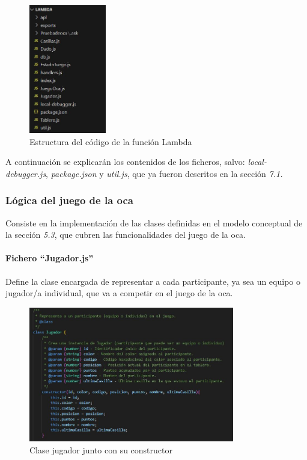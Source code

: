 \begin{figure}[H]
	\centering
	\includegraphics[width=0.3\textwidth]{imgs/estructura-codigo.jpg}
	\caption{Estructura del código de la función Lambda}
	\label{fig:estructura-codigo}
\end{figure}

A continuación se explicarán los contenidos de los ficheros, salvo: \textit{local-debugger.js}, \textit{package.json} y \textit{util.js}, que ya fueron descritos en la sección \textit{7.1.}

\subsubsection{Lógica del juego de la oca}

Consiste en la implementación de las clases definidas en el modelo conceptual de la sección \textit{5.3}, que cubren las funcionalidades del juego de la oca.

\paragraph{Fichero \enquote{Jugador.js}}

Define la clase encargada de representar a cada participante, ya sea un equipo o jugador/a individual, que va a competir en el juego de la oca.

\begin{figure}[H]
	\centering
	\includegraphics[width=0.8\textwidth]{imgs/codigo-jugador.jpg}
	\caption{Clase jugador junto con su constructor}
	\label{fig:codigo-jugador}
\end{figure}

